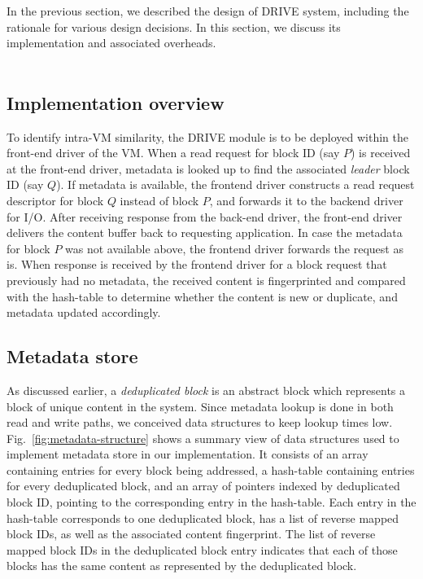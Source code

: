 
In the previous section, we described the design of DRIVE system, 
including the rationale for various design decisions. In this section, we
discuss its implementation and associated overheads.
\\
\\
\subsection{Implementation overview}
To identify intra-VM similarity, 
the DRIVE module is to be deployed
within the front-end driver of the VM. 
When a read request for block ID (say $P$) is 
received at the front-end driver,
metadata is looked up to find the associated \textit{leader} 
block ID (say $Q$).
If metadata is available, the frontend 
driver constructs a read request
descriptor for block $Q$ instead of block $P$, 
and forwards it to the backend driver for I/O. 
After receiving response from the back-end driver, the 
front-end driver delivers the content buffer back 
to requesting application.
In case the metadata for block $P$ was not available above, 
the frontend driver forwards the request as is.
When response is received by the frontend driver 
for a block request that previously had no metadata,
the received content is fingerprinted
and compared with the hash-table 
to determine whether the content is new or duplicate, 
and metadata updated accordingly.

\subsection{Metadata store}
As discussed earlier, a \textit{deduplicated block}
is an abstract block which represents a block of unique content in the system.
Since metadata lookup is done in both read and write paths,
we conceived data structures to keep lookup times low.
Fig.~\ref{fig:metadata-structure} shows a summary view of
data structures used to implement metadata store in our implementation.
It consists of an array containing entries for every block being
addressed, a hash-table containing entries for every deduplicated block, 
and an array of pointers indexed by deduplicated block ID, pointing to
the corresponding entry in the hash-table.
Each entry in the hash-table corresponds to 
one deduplicated block,
has a list of reverse mapped block IDs, as well as the associated 
content fingerprint.
The list of reverse mapped block IDs in the deduplicated block entry 
indicates that each of those 
blocks has the same content as represented by the deduplicated block.

